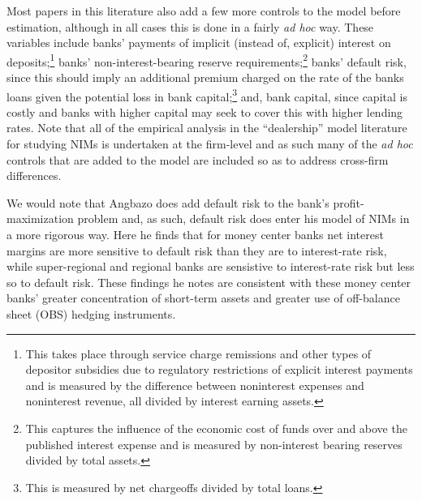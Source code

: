 \documentclass[11pt]{article}
\renewcommand{\baselinestretch}{1.5}
\begin{document}
Most papers in this literature also add a few more controls to the model before estimation, although in all cases this is done in a fairly \textit{ad hoc} way.  These variables include banks' payments of implicit (instead of, explicit) interest on deposits;\renewcommand{\baselinestretch}{1}\footnote{This takes place through service charge remissions and other types of depositor subsidies due to regulatory restrictions of explicit interest payments and is measured by the difference between noninterest expenses and noninterest revenue, all divided by interest earning assets.\vspace{0.05in}}\renewcommand{\baselinestretch}{1.5} banks' non-interest-bearing reserve requirements;\renewcommand{\baselinestretch}{1}\footnote{This captures the influence of the economic cost of funds over and above the published interest expense and is measured by non-interest bearing reserves divided by total assets.\vspace{0.05in}}\renewcommand{\baselinestretch}{1.5} banks' default risk, since this should imply an additional premium charged on the rate of the banks loans given the potential loss in bank capital;\renewcommand{\baselinestretch}{1}\footnote{This is measured by net chargeoffs divided by total loans.\vspace{0.05in}}\renewcommand{\baselinestretch}{1.5} and, bank capital, since capital is costly and banks with higher capital may seek to cover this with higher lending rates.  Note that all of the empirical analysis in the ``dealership'' model literature for studying NIMs is undertaken at the firm-level and as such many of the \textit{ad hoc} controls that are added to the model are included so as to address cross-firm differences.

We would note that Angbazo does add default risk to the bank's profit-maximization problem and, as such, default risk does enter his model of NIMs in a more rigorous way.  Here he finds that for money center banks net interest margins are more sensitive to default risk than they are to interest-rate risk, while super-regional and regional banks are sensistive to interest-rate risk but less so to default risk. These findings he notes are consistent with these money center banks' greater concentration of short-term assets and greater use of off-balance sheet (OBS) hedging instruments.
\end{document}
